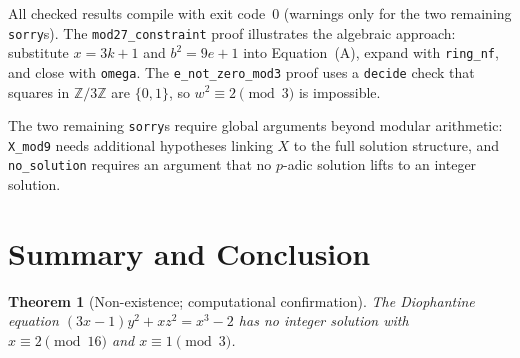 \documentclass[12pt,a4paper]{article}
\newtheorem{theorem}{Theorem}
\begin{document}
\noindent
All checked results compile with exit code~0 (warnings only for the two remaining
\texttt{sorry}s). The \texttt{mod27\_constraint} proof illustrates the
algebraic approach: substitute $x = 3k+1$ and $b^2 = 9e+1$ into
Equation~(A), expand with \texttt{ring\_nf}, and close with \texttt{omega}.
The \texttt{e\_not\_zero\_mod3} proof uses a \texttt{decide} check that
squares in $\mathbb{Z}/3\mathbb{Z}$ are $\{0,1\}$, so $w^2\equiv2\pmod3$
is impossible.

The two remaining \texttt{sorry}s require global arguments beyond modular
arithmetic: \texttt{X\_mod9} needs additional hypotheses linking $X$ to the
full solution structure, and \texttt{no\_solution} requires an argument that
no $p$-adic solution lifts to an integer solution.

\section{Summary and Conclusion}
\label{sec:conclusion}

\begin{theorem}[Non-existence; computational confirmation]\label{thm:comp}
The Diophantine equation $(3x-1)y^2 + xz^2 = x^3-2$ has no integer solution
with $x \equiv 2 \pmod{16}$ and $x \equiv 1 \pmod{3}$.
\end{theorem}
\end{document}

